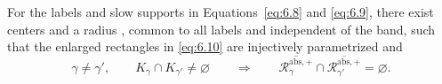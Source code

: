 \begin{lemma}\label{lem:6.1}
For the labels  and slow supports  in Equations~\eqref{eq:6.8} and \eqref{eq:6.9}, there exist centers  and a radius , common to all labels and independent of the band, such that the enlarged rectangles in \eqref{eq:6.10} are injectively parametrized and
\begin{equation}
 \gamma\ne\gamma',\qquad K_\gamma\cap K_{\gamma'}\ne\varnothing
 \qquad\Longrightarrow\qquad
 \overline{\mathcal R_\gamma^{\mathrm{abs},+}}
 \cap
 \overline{\mathcal R_{\gamma'}^{\mathrm{abs},+}}
 =\varnothing.
 \tag{6.13}\label{eq:6.13}
\end{equation}
\end{lemma}

